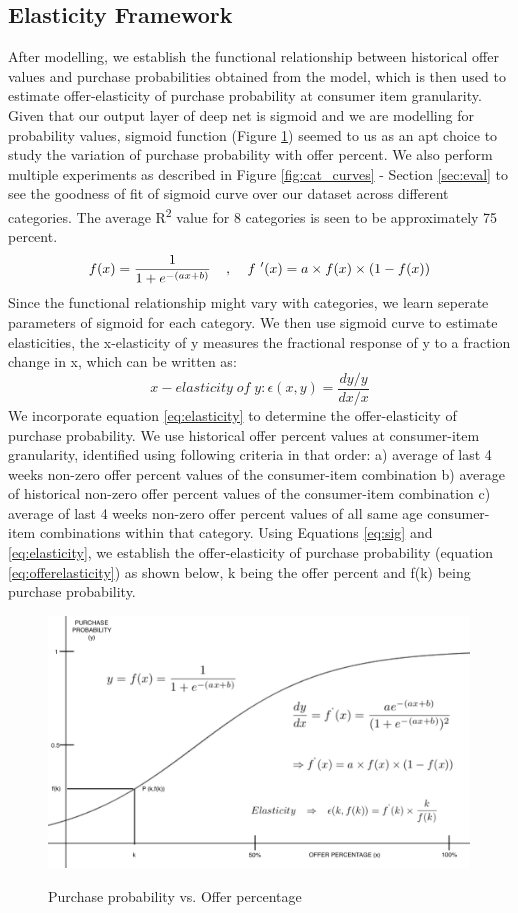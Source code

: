 \subsection{Elasticity Framework}
After modelling, we establish the functional relationship between historical offer values and purchase
probabilities obtained from the model, which is then used to estimate offer-elasticity of purchase probability at 
consumer item granularity. Given that our output layer of deep net is sigmoid and we are modelling for
probability values, sigmoid function (Figure \ref{fig:elasticity}) seemed to us as an apt choice to study 
the variation of purchase probability with offer percent. We also perform multiple experiments as described in 
Figure \ref{fig:cat_curves} - Section \ref{sec:eval} to see the goodness of fit of sigmoid curve over our 
dataset across different categories. The average R\textsuperscript{2} value for 8 categories 
is seen to be approximately 75 percent.
\begin{equation}
    f(x) = \frac{1}{1 + e^{-(ax+b)}} \;\;\;\; ,\;\;\;\;
    f\textsuperscript{'}(x) = a\times f(x)\times (1 - f(x))
    \label{eq:sig}
  \end{equation}
Since the functional relationship might vary with categories, we learn seperate parameters of sigmoid for each category.
We then use sigmoid curve to estimate elasticities, the x-elasticity of y measures the fractional response of y to a 
fraction change in x, which can be written as:
\begin{equation}
    x-elasticity \;of\; y: \epsilon(x,y) = \frac{dy/y}{dx/x}
    \label{eq:elasticity}
  \end{equation}
We incorporate equation \ref{eq:elasticity} to determine the offer-elasticity of purchase probability.
We use historical offer percent values at consumer-item granularity, identified using following criteria
in that order: a) average of last 4 weeks non-zero offer percent values of the consumer-item combination
b) average of historical non-zero offer percent values of the consumer-item combination
c) average of last 4 weeks non-zero offer percent values of all same age consumer-item combinations within that category.
Using Equations \ref{eq:sig} and \ref{eq:elasticity}, we establish the offer-elasticity of purchase probability
(equation \ref{eq:offerelasticity}) as  shown below, k being the offer percent and f(k) being purchase probability.
  \begin{figure}[t]
    \centering 
    \caption{Purchase probability vs. Offer percentage} 
    \includegraphics[width=4.4in]{img/elasticity.png} 
    \label{fig:elasticity} 
  \end{figure}
